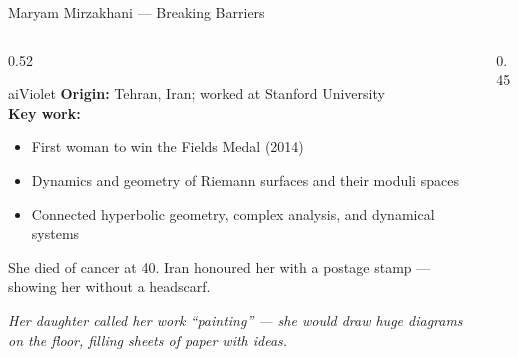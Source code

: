\begin{frame}[shrink=25]{Maryam Mirzakhani --- Breaking Barriers}

  \begin{columns}[T]
    \begin{column}{0.52\textwidth}
      \begin{personbox}{aiViolet}
        \textbf{Origin:} Tehran, Iran; worked at Stanford University\\[3pt]
        \textbf{Key work:}
        \begin{itemize}\setlength\itemsep{2pt}
          \item \alert{First woman to win the Fields Medal} (2014)
          \item Dynamics and geometry of Riemann surfaces and their
                moduli spaces
          \item Connected hyperbolic geometry, complex analysis, and
                dynamical systems
        \end{itemize}
      \end{personbox}

      \vspace{0.3em}
      \begin{insightbox}
        She died of cancer at 40. Iran honoured her with a postage stamp
        --- showing her without a headscarf.
      \end{insightbox}

      \vspace{0.2em}
      {\small\itshape Her daughter called her work ``painting'' --- she
      would draw huge diagrams on the floor, filling sheets of paper
      with ideas.}
    \end{column}

    \begin{column}{0.45\textwidth}

      \vspace{0.5em}
    \end{column}
  \end{columns}


\end{frame}
